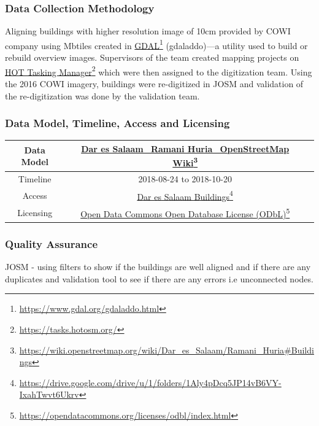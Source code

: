\documentclass[a4paper,12pt,twoside]{article}
\begin{document}
\subsubsection{Data Collection Methodology}

Aligning buildings with higher resolution image of 10cm provided by COWI company using Mbtiles created in \href{https://www.gdal.org/gdaladdo.html}{GDAL}\footnote{\url{https://www.gdal.org/gdaladdo.html}} (gdaladdo)---a utility used to build or rebuild overview images. Supervisors of the team created mapping projects on \href{https://tasks.hotosm.org/}{HOT Tasking Manager}\footnote{\url{https://tasks.hotosm.org/}} which were then assigned to the digitization team. Using the 2016 COWI imagery, buildings were re-digitized in JOSM and validation of the re-digitization was done by the validation team.

\subsubsection{Data Model, Timeline, Access and Licensing}
\begin{center}
\begin{tabular}{|c|c|c|}  
 \hline
Data Model &
        \href{https://wiki.openstreetmap.org/wiki/Dar_es_Salaam/Ramani_Huria\#Buildings}{Dar es Salaam\_Ramani Huria\_OpenStreetMap Wiki}\footnote{\url{https://wiki.openstreetmap.org/wiki/Dar_es_Salaam/Ramani_Huria\#Buildings}} \\
 \hline
  Timeline  &  2018-08-24 to 2018-10-20 \\
\hline  
 Access  & 
    \href{https://drive.google.com/drive/u/1/folders/1Aly4pDcq5JP14vB6VY-IxahTwvt6Ukrv}{Dar es Salaam Buildings}\footnote{\url{https://drive.google.com/drive/u/1/folders/1Aly4pDcq5JP14vB6VY-IxahTwvt6Ukrv}} \\
   
\hline 
    Licensing & \href{https://opendatacommons.org/licenses/odbl/index.html}{Open Data Commons Open Database License (ODbL)}\footnote{\url{https://opendatacommons.org/licenses/odbl/index.html}} \\
\hline
\end{tabular}
\end{center}

\subsubsection{Quality Assurance}
JOSM - using filters to show if the buildings are well aligned and if there are any duplicates and validation tool to see if there are any errors i.e unconnected nodes.
\end{document}
